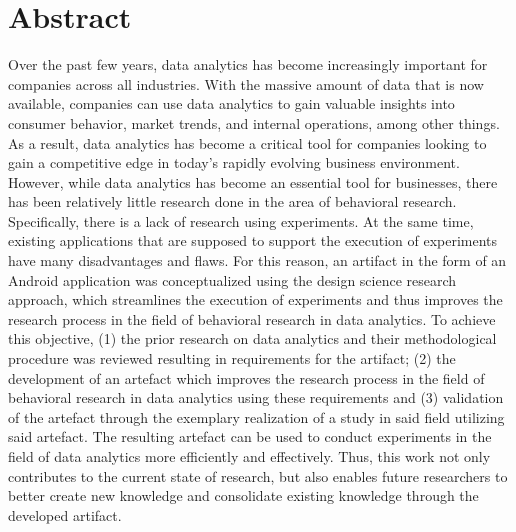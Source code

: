 \section*{Abstract}
Over the past few years, data analytics has become increasingly important for companies across all industries. With the massive amount of data that is now available, companies can use data analytics to gain valuable insights into consumer behavior, market trends, and internal operations, among other things. As a result, data analytics has become a critical tool for companies looking to gain a competitive edge in today's rapidly evolving business environment. However, while data analytics has become an essential tool for businesses, there has been relatively little research done in the area of behavioral research. %
Specifically, there is a lack of research using experiments. At the same time, existing applications that are supposed to support the execution of experiments have many disadvantages and flaws. For this reason, an artifact in the form of an Android application was conceptualized using the design science research approach, which streamlines the execution of experiments and thus improves the research process in the field of behavioral research in data analytics. To achieve this objective, (1) the prior research on data analytics and their methodological procedure was reviewed resulting in requirements for the artifact; (2) the development of an artefact which improves the research process in the field of behavioral research in data analytics using these requirements and (3) validation of the artefact through the exemplary realization of a study in said field utilizing said artefact. The resulting artefact can be used to conduct experiments in the field of data analytics more efficiently and effectively. Thus, this work not only contributes to the current state of research, but also enables future researchers to better create new knowledge and consolidate existing knowledge through the developed artifact. %




